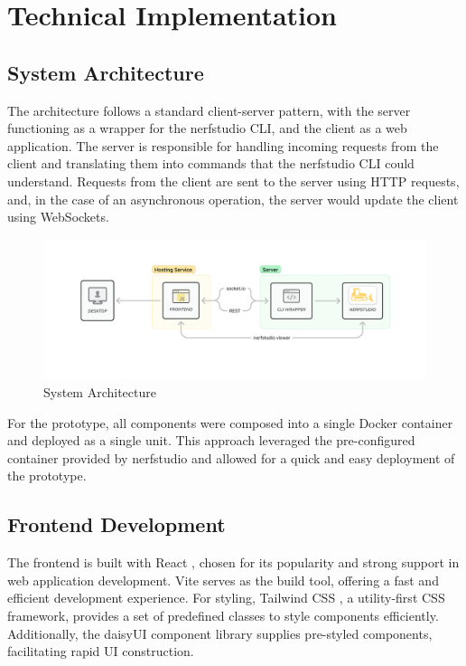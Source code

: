 %
\chapter{Technical Implementation}
\label{sec:system}

\section{System Architecture}
\label{sec:system:architecture}

The architecture follows a standard client-server pattern, with the server functioning as a wrapper for the nerfstudio CLI, and the client as a web application.
The server is responsible for handling incoming requests from the client and translating them into commands that the nerfstudio CLI could understand.
Requests from the client are sent to the server using HTTP requests, and, in the case of an asynchronous operation, the server would update the client using WebSockets.

\begin{figure}[htb]
	\includegraphics[width=\textwidth]{figures/architecture-1.png}
	\caption{System Architecture}
	\label{fig:system:example2}
\end{figure}

For the prototype, all components were composed into a single Docker container and deployed as a single unit.
This approach leveraged the pre-configured container provided by nerfstudio and allowed for a quick and easy deployment of the prototype.

\section{Frontend Development} 
\label{sec:system:frontend}

The frontend is built with React \cite{noauthor_react_nodate}, chosen for its popularity and strong support in web application development.
Vite \cite{noauthor_vite_nodate} serves as the build tool, offering a fast and efficient development experience.
For styling, Tailwind CSS \cite{noauthor_tailwind_2020}, a utility-first CSS framework, provides a set of predefined classes to style components efficiently.
Additionally, the daisyUI \cite{noauthor_daisyui_nodate} component library supplies pre-styled components, facilitating rapid UI construction.

